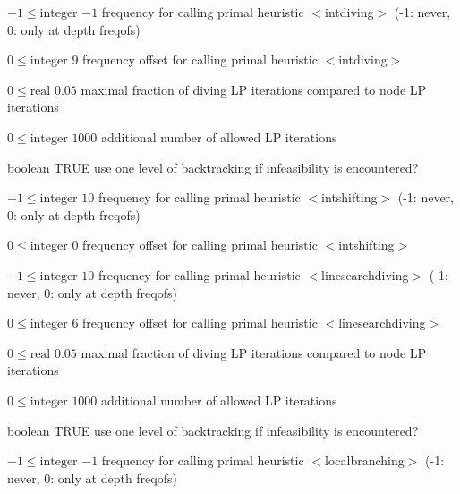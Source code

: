 %
{$-1\leq\textrm{integer}$}%
{$-1$}%
{frequency for calling primal heuristic $<$intdiving$>$ (-1: never, 0: only at depth freqofs)}%
{}

%
{$0\leq\textrm{integer}$}%
{$9$}%
{frequency offset for calling primal heuristic $<$intdiving$>$}%
{}

%
{$0\leq\textrm{real}$}%
{$0.05$}%
{maximal fraction of diving LP iterations compared to node LP iterations}%
{}

%
{$0\leq\textrm{integer}$}%
{$1000$}%
{additional number of allowed LP iterations}%
{}

%
{boolean}%
{TRUE}%
{use one level of backtracking if infeasibility is encountered?}%
{}

%
{$-1\leq\textrm{integer}$}%
{$10$}%
{frequency for calling primal heuristic $<$intshifting$>$ (-1: never, 0: only at depth freqofs)}%
{}

%
{$0\leq\textrm{integer}$}%
{$0$}%
{frequency offset for calling primal heuristic $<$intshifting$>$}%
{}

%
{$-1\leq\textrm{integer}$}%
{$10$}%
{frequency for calling primal heuristic $<$linesearchdiving$>$ (-1: never, 0: only at depth freqofs)}%
{}

%
{$0\leq\textrm{integer}$}%
{$6$}%
{frequency offset for calling primal heuristic $<$linesearchdiving$>$}%
{}

%
{$0\leq\textrm{real}$}%
{$0.05$}%
{maximal fraction of diving LP iterations compared to node LP iterations}%
{}

%
{$0\leq\textrm{integer}$}%
{$1000$}%
{additional number of allowed LP iterations}%
{}

%
{boolean}%
{TRUE}%
{use one level of backtracking if infeasibility is encountered?}%
{}

%
{$-1\leq\textrm{integer}$}%
{$-1$}%
{frequency for calling primal heuristic $<$localbranching$>$ (-1: never, 0: only at depth freqofs)}%
{}

